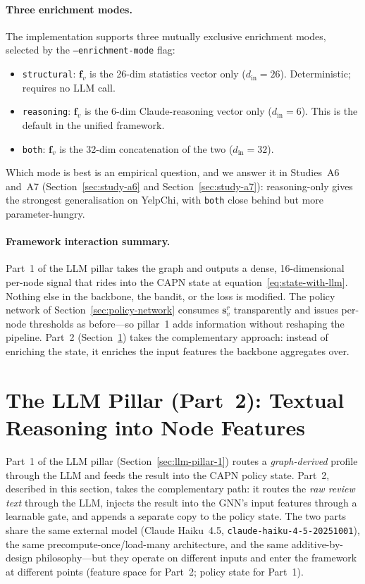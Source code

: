\paragraph{Three enrichment modes.} The implementation supports three mutually exclusive enrichment modes, selected by the \texttt{--enrichment-mode} flag:

\begin{itemize}
    \item \texttt{structural}: $\mathbf{f}_v$ is the 26-dim statistics vector only ($d_{\text{in}}=26$). Deterministic; requires no LLM call.
    \item \texttt{reasoning}: $\mathbf{f}_v$ is the 6-dim Claude-reasoning vector only ($d_{\text{in}}=6$). This is the default in the unified framework.
    \item \texttt{both}: $\mathbf{f}_v$ is the 32-dim concatenation of the two ($d_{\text{in}}=32$).
\end{itemize}

Which mode is best is an empirical question, and we answer it in Studies~A6 and~A7 (Section~\ref{sec:study-a6} and Section~\ref{sec:study-a7}): reasoning-only gives the strongest generalisation on YelpChi, with \texttt{both} close behind but more parameter-hungry.

\paragraph{Framework interaction summary.} Part~1 of the LLM pillar takes the graph and outputs a dense, 16-dimensional per-node signal that rides into the CAPN state at equation~\eqref{eq:state-with-llm}. Nothing else in the backbone, the bandit, or the loss is modified. The policy network of Section~\ref{sec:policy-network} consumes $\mathbf{s}_v^{r}$ transparently and issues per-node thresholds as before---so pillar~1 adds information without reshaping the pipeline. Part~2 (Section~\ref{sec:llm-pillar-2}) takes the complementary approach: instead of enriching the state, it enriches the input features the backbone aggregates over.


\section{The LLM Pillar (Part~2): Textual Reasoning into Node Features}
\label{sec:llm-pillar-2}
\label{sec:unified-framework}

Part~1 of the LLM pillar (Section~\ref{sec:llm-pillar-1}) routes a \emph{graph-derived} profile through the LLM and feeds the result into the CAPN policy state. Part~2, described in this section, takes the complementary path: it routes the \emph{raw review text} through the LLM, injects the result into the GNN's input features through a learnable gate, and appends a separate copy to the policy state. The two parts share the same external model (Claude Haiku~4.5, \texttt{claude-haiku-4-5-20251001}), the same precompute-once/load-many architecture, and the same additive-by-design philosophy---but they operate on different inputs and enter the framework at different points (feature space for Part~2; policy state for Part~1).

